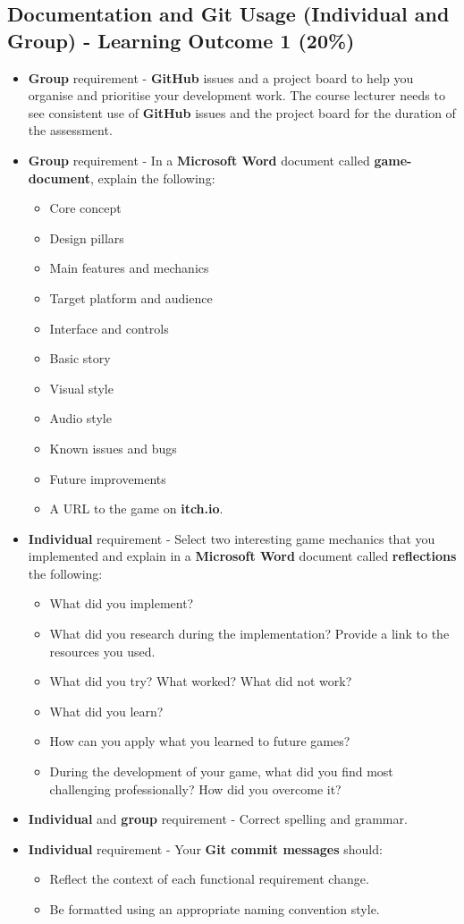 \documentclass{article}
\begin{document}
\subsection*{Documentation and Git Usage (Individual and Group) - Learning Outcome 1 (20\%)}
\begin{itemize}
	\item \textbf{Group} requirement - \textbf{GitHub} issues and a project board to help you organise and prioritise your development work. The course lecturer needs to see consistent use of \textbf{GitHub} issues and the project board for the duration of the assessment.
	\item \textbf{Group} requirement - In a \textbf{Microsoft Word} document called \textbf{game-document}, explain the following: 
	\begin{itemize}
		\item Core concept
		\item Design pillars
		\item Main features and mechanics
		\item Target platform and audience
		\item Interface and controls
		\item Basic story
		\item Visual style
		\item Audio style
		\item Known issues and bugs
		\item Future improvements
		\item A URL to the game on \textbf{itch.io}.
	\end{itemize}
	\item \textbf{Individual} requirement - Select two interesting game mechanics that you implemented and explain in a \textbf{Microsoft Word} document called \textbf{reflections} the following:
		\begin{itemize}
			\item What did you implement?
			\item What did you research during the implementation? Provide a link to the resources you used.
			\item What did you try? What worked? What did not work?
			\item What did you learn?
			\item How can you apply what you learned to future games?
			\item During the development of your game, what did you find most challenging professionally? How did you overcome it?
		\end{itemize}
    \item \textbf{Individual} and \textbf{group} requirement - Correct spelling and grammar.
    \item \textbf{Individual} requirement - Your \textbf{Git commit messages} should:
    \begin{itemize}
      \item Reflect the context of each functional requirement change.
      \item Be formatted using an appropriate naming convention style.
    \end{itemize}
\end{itemize} 
\end{document}
